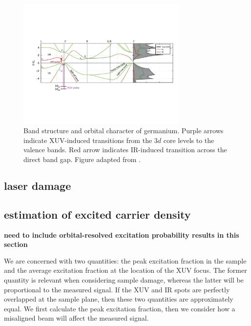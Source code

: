\begin{figure}
	\centering
	\includegraphics[width=0.75\textwidth]{figures/chap4/Ge_band_diagram_Zurch2017.pdf}
	\caption{Band structure and orbital character of germanium. Purple arrows indicate XUV-induced transitions from the $3d$ core levels to the valence bands. Red arrow indicates IR-induced transition across the direct band gap. Figure adapted from \cite{zurchDirectSimultaneousObservation2017}.}
	\label{fig:Ge_band_diagram}
\end{figure}




\subsection{laser damage}

\subsection{estimation of excited carrier density}
\label{sec:estimate_excited_carrier_density}

\textbf{need to include orbital-resolved excitation probability results in this section}

We are concerned with two quantities: the peak excitation fraction in the sample and the average excitation fraction at the location of the XUV focus. The former quantity is relevant when considering sample damage, whereas the latter will be proportional to the measured signal. If the XUV and IR spots are perfectly overlapped at the sample plane, then these two quantities are approximately equal. We first calculate the peak excitation fraction, then we consider how a misaligned beam will affect the measured signal.


